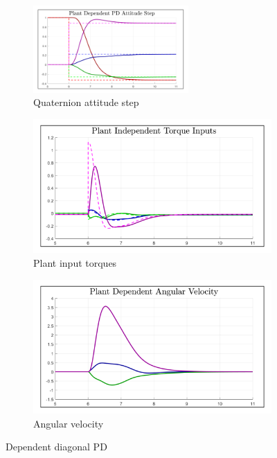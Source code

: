 \begin{figure}[htbp]
\centering
\begin{subfigure}{\textwidth}
\centering
\includegraphics[width=0.65\textwidth]{graphs/PD_Diagonal_Dependent_Step}
\caption{Quaternion attitude step}
\label{fig:PD_Diagonal_Dependent_Step}
\end{subfigure}
\begin{subfigure}{0.49\textwidth}
\centering
\includegraphics[width=\textwidth]{graphs/PD_Diagonal_Dependent_Torque}
\caption{Plant input torques}
\label{fig:PD_Diagonal_Dependent_Torque}
\end{subfigure}
\begin{subfigure}{0.49\textwidth}
\centering
\includegraphics[width=\textwidth]{graphs/PD_Diagonal_Dependent_Angular}
\caption{Angular velocity}
\label{fig:PD_Diagonal_Dependent_Angular}
\end{subfigure}
\caption{Dependent diagonal PD}
\end{figure}
